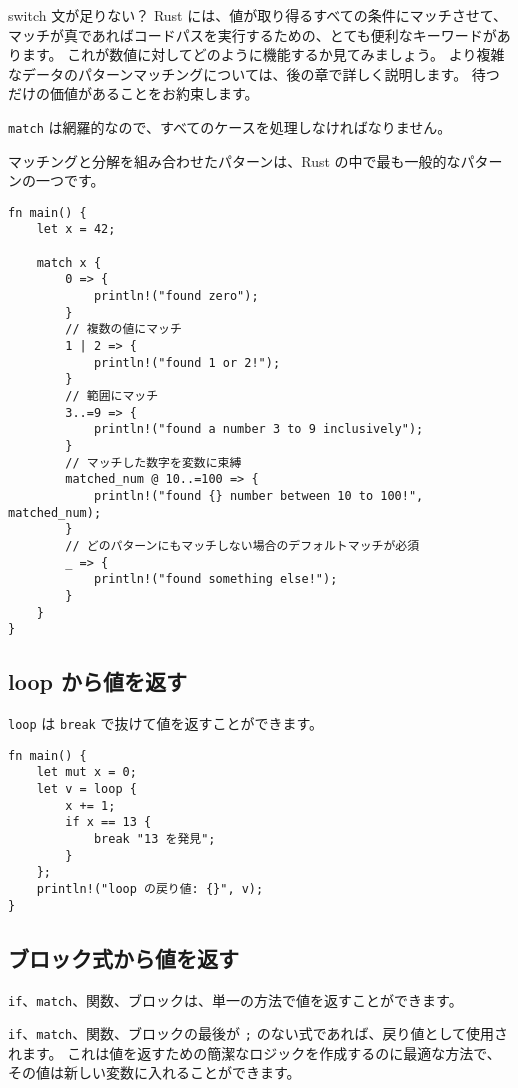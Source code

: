 switch 文が足りない？ Rust
には、値が取り得るすべての条件にマッチさせて、マッチが真であればコードパスを実行するための、とても便利なキーワードがあります。
これが数値に対してどのように機能するか見てみましょう。
より複雑なデータのパターンマッチングについては、後の章で詳しく説明します。
待つだけの価値があることをお約束します。

\texttt{match}
は網羅的なので、すべてのケースを処理しなければなりません。

マッチングと分解を組み合わせたパターンは、Rust
の中で最も一般的なパターンの一つです。

\begin{verbatim}
fn main() {
    let x = 42;

    match x {
        0 => {
            println!("found zero");
        }
        // 複数の値にマッチ
        1 | 2 => {
            println!("found 1 or 2!");
        }
        // 範囲にマッチ
        3..=9 => {
            println!("found a number 3 to 9 inclusively");
        }
        // マッチした数字を変数に束縛
        matched_num @ 10..=100 => {
            println!("found {} number between 10 to 100!", matched_num);
        }
        // どのパターンにもマッチしない場合のデフォルトマッチが必須
        _ => {
            println!("found something else!");
        }
    }
}
\end{verbatim}

\subsection{loop
から値を返す}

\texttt{loop} は \texttt{break} で抜けて値を返すことができます。

\begin{verbatim}
fn main() {
    let mut x = 0;
    let v = loop {
        x += 1;
        if x == 13 {
            break "13 を発見";
        }
    };
    println!("loop の戻り値: {}", v);
}
\end{verbatim}

\subsection{ブロック式から値を返す}

\texttt{if}、\texttt{match}、関数、ブロックは、単一の方法で値を返すことができます。

\texttt{if}、\texttt{match}、関数、ブロックの最後が \texttt{;}
のない式であれば、戻り値として使用されます。
これは値を返すための簡潔なロジックを作成するのに最適な方法で、その値は新しい変数に入れることができます。

